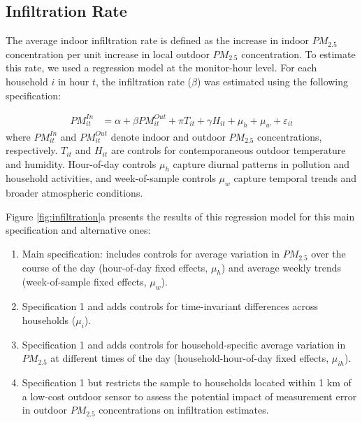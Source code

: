 \documentclass[reqno,12pt,notitlepage]{article}
\begin{document}
\subsection{Infiltration Rate}
The average indoor infiltration rate is defined as the increase in indoor $PM_{2.5}$ concentration per unit increase in local outdoor $PM_{2.5}$ concentration. To estimate this rate, we used a regression model at the monitor-hour level. For each household $i$ in hour $t$, the infiltration rate ($\beta$) was estimated using the following specification:

\begin{align}
\label{eq:infiltration}
    PM^{In}_{it} &= \alpha + \beta PM^{Out}_{it} + \pi T_{it} + \gamma H_{it} + \mu_h + \mu_w + \varepsilon_{it}
\end{align}
where $PM^{In}_{it}$ and $PM^{Out}_{it}$ denote indoor and outdoor $PM_{2.5}$ concentrations, respectively. $T_{it}$ and $H_{it}$ are controls for contemporaneous outdoor temperature and humidity. Hour-of-day controls $\mu_h$ capture diurnal patterns in pollution and household activities, and week-of-sample controls $\mu_w$ capture temporal trends and broader atmospheric conditions.


Figure \ref{fig:infiltration}a presents the results of this regression model for this main specification and alternative ones: 
\begin{enumerate}
    \item Main specification: includes controls for average variation in $PM_{2.5}$ over the course of the day (hour-of-day fixed effects, $\mu_h$) and average weekly trends (week-of-sample fixed effects, $\mu_w$).
    \item Specification 1 and adds controls for time-invariant differences across households ($\mu_i$).
    \item Specification 1 and adds controls for household-specific average variation in $PM_{2.5}$ at different times of the day (household-hour-of-day fixed effects, $\mu_{ih}$).
    \item Specification 1 but restricts the sample to households located within 1 km of a low-cost outdoor sensor to assess the potential impact of measurement error in outdoor $PM_{2.5}$ concentrations on infiltration estimates.
\end{enumerate}
\end{document}
